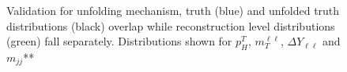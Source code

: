 \begin{figure}[!h]
\centering
\centering
  \hfill
  \hfill
  \hfill
\caption{\label{fig:unfoldingvalidation}Validation for unfolding mechanism, truth (blue) and unfolded truth distributions (black) overlap while reconstruction level distributions (green) fall separately. Distributions shown for $p^T_H$, $m_T^{\ell\ell}$, $\Delta Y_{\ell\ell}$ and $m_{jj}$**}
\end{figure}

